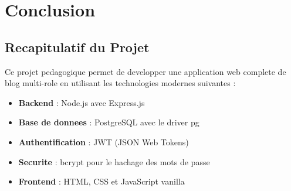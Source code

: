 \documentclass[a4paper,12pt]{book}
\begin{document}





\chapter{Conclusion}

\section{Recapitulatif du Projet}

Ce projet pedagogique permet de developper une application web complete de blog multi-role en utilisant les technologies modernes suivantes :

\begin{itemize}
    \item \textbf{Backend} : Node.js avec Express.js
    \item \textbf{Base de donnees} : PostgreSQL avec le driver pg
    \item \textbf{Authentification} : JWT (JSON Web Tokens)
    \item \textbf{Securite} : bcrypt pour le hachage des mots de passe
    \item \textbf{Frontend} : HTML, CSS et JavaScript vanilla
\end{itemize}
\end{document}
